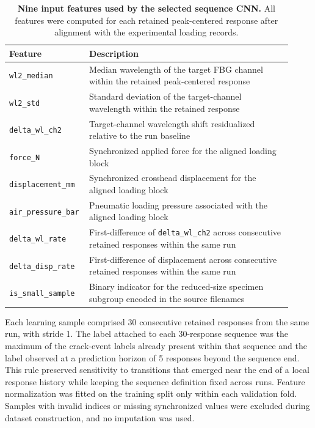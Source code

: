\documentclass[fleqn,10pt]{wlscirep}
\begin{document}
\begin{table}[htbp]
\centering
\caption{\textbf{Nine input features used by the selected sequence CNN.} All features were computed for each retained peak-centered response after alignment with the experimental loading records.}
\label{tab:input_summary}
\small
\begin{tabular}{p{0.22\linewidth}p{0.70\linewidth}}
\hline
Feature & Description \\
\hline
\texttt{wl2\_median} & Median wavelength of the target FBG channel within the retained peak-centered response \\
\texttt{wl2\_std} & Standard deviation of the target-channel wavelength within the retained response \\
\texttt{delta\_wl\_ch2} & Target-channel wavelength shift residualized relative to the run baseline \\
\texttt{force\_N} & Synchronized applied force for the aligned loading block \\
\texttt{displacement\_mm} & Synchronized crosshead displacement for the aligned loading block \\
\texttt{air\_pressure\_bar} & Pneumatic loading pressure associated with the aligned loading block \\
\texttt{delta\_wl\_rate} & First-difference of \texttt{delta\_wl\_ch2} across consecutive retained responses within the same run \\
\texttt{delta\_disp\_rate} & First-difference of displacement across consecutive retained responses within the same run \\
\texttt{is\_small\_sample} & Binary indicator for the reduced-size specimen subgroup encoded in the source filenames \\
\hline
\end{tabular}
\end{table}

\FloatBarrier

Each learning sample comprised 30 consecutive retained responses from the same run, with stride 1. The label attached to each 30-response sequence was the maximum of the crack-event labels already present within that sequence and the label observed at a prediction horizon of 5 responses beyond the sequence end. This rule preserved sensitivity to transitions that emerged near the end of a local response history while keeping the sequence definition fixed across runs. Feature normalization was fitted on the training split only within each validation fold. Samples with invalid indices or missing synchronized values were excluded during dataset construction, and no imputation was used.
\end{document}
